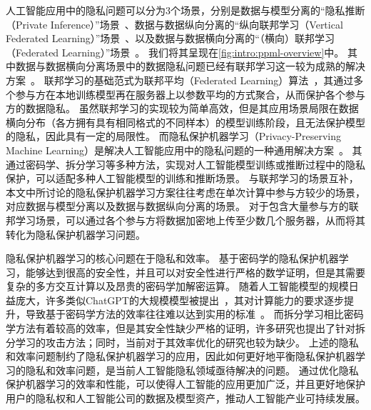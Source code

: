 人工智能应用中的隐私问题可以分为3个场景，分别是数据与模型分离的“隐私推断（Private Inference）”场景~\cite{mann_2023_secure_inference}、数据与数据纵向分离的“纵向联邦学习（Vertical Federated Learning）”场景~\cite{liu2024vertical}、以及数据与数据横向分离的“（横向）联邦学习（Federated Learning）”场景~\cite{yangqiang2019federated}。
%
我们将其呈现在\autoref{fig:intro:ppml-overview}中。
%
其中数据与数据横向分离场景中的数据隐私问题已经有联邦学习这一较为成熟的解决方案~\cite{yangqiang2019federated}。
联邦学习的基础范式为联邦平均（Federated Learning）算法~\cite{mcmahan_2017_fedavg}，其通过多个参与方在本地训练模型再在服务器上以参数平均的方式聚合，从而保护各个参与方的数据隐私。
%
虽然联邦学习的实现较为简单高效，但是其应用场景局限在数据横向分布（各方拥有具有相同格式的不同样本）的模型训练阶段，且无法保护模型的隐私，因此具有一定的局限性。
%
而隐私保护机器学习（Privacy-Preserving Machine Learning）是解决人工智能应用中的隐私问题的一种通用解决方案~\cite{al_2019_ppml,xu_2021_ppml}。
%
其通过密码学、拆分学习等多种方法，实现对人工智能模型训练或推断过程中的隐私保护，可以适配多种人工智能模型的训练和推断场景。
%
与联邦学习的场景互补，本文中所讨论的隐私保护机器学习方案往往考虑在单次计算中参与方较少的场景，对应数据与模型分离以及数据与数据纵向分离的场景。
%
对于包含大量参与方的联邦学习场景，可以通过各个参与方将数据加密地上传至少数几个服务器，从而将其转化为隐私保护机器学习问题。

隐私保护机器学习的核心问题在于隐私和效率。
%
基于密码学的隐私保护机器学习，能够达到很高的安全性，并且可以对安全性进行严格的数学证明，但是其需要复杂的多方交互计算以及昂贵的密码学加解密运算。
随着人工智能模型的规模日益庞大，许多类似ChatGPT的大规模模型被提出~\cite{chatgpt,touvron_2023_llama,duzhengxiao_2022_glm}，其对计算能力的要求逐步提升，导致基于密码学方法的效率往往难以达到实用的标准~\cite{hou2023ciphergpt}。
%
而拆分学习相比密码学方法有着较高的效率，但是其安全性缺少严格的证明，许多研究也提出了针对拆分学习的攻击方法；同时，当前对于其效率优化的研究也较为缺少。
%
上述的隐私和效率问题制约了隐私保护机器学习的应用，因此如何更好地平衡隐私保护机器学习的隐私和效率问题，是当前人工智能隐私领域亟待解决的问题。
%
通过优化隐私保护机器学习的效率和性能，可以使得人工智能的应用更加广泛，并且更好地保护用户的隐私权和人工智能公司的数据及模型资产，推动人工智能产业可持续发展。


